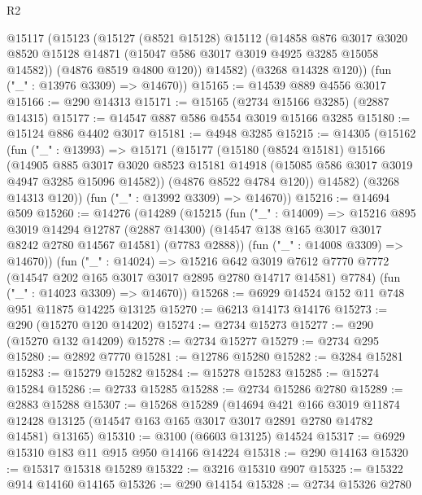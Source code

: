 \begin{lexlean}{R2}
\begin{coremodule}
      @15117
        (@15123
          (@15127
            (@8521 @15128)
            @15112
            (@14858
              @876
              @3017
              @3020
              @8520
              @15128
              @14871
              (@15047 @586 @3017 @3019 @4925 @3285 @15058 @14582))
            (@4876 @8519 @4800 @120))
          @14582)
        (@3268 @14328 @120))
      (fun ("_" : @13976 @3309) => @14670))
@15165 := @14539 @889 @4556 @3017
@15166 := @290 @14313
@15171 := @15165 (@2734 @15166 @3285) (@2887 @14315)
@15177 := @14547 @887 @586 @4554 @3019 @15166 @3285
@15180 := @15124 @886 @4402 @3017
@15181 := @4948 @3285
@15215 := @14305
    (@15162
      (fun ("_" : @13993) =>
      @15171
        (@15177
          (@15180
            (@8524 @15181)
            @15166
            (@14905
              @885
              @3017
              @3020
              @8523
              @15181
              @14918
              (@15085 @586 @3017 @3019 @4947 @3285 @15096 @14582))
            (@4876 @8522 @4784 @120))
          @14582)
        (@3268 @14313 @120))
      (fun ("_" : @13992 @3309) => @14670))
@15216 := @14694 @509
@15260 := @14276
    (@14289
      (@15215
        (fun ("_" : @14009) =>
        @15216
          @895
          @3019
          @14294
          @12787
          (@2887 @14300)
          (@14547 @138 @165 @3017 @3017 @8242 @2780 @14567 @14581)
          (@7783 @2888))
        (fun ("_" : @14008 @3309) => @14670))
      (fun ("_" : @14024) =>
      @15216
        @642
        @3019
        @7612
        @7770
        @7772
        (@14547 @202 @165 @3017 @3017 @2895 @2780 @14717 @14581)
        @7784)
      (fun ("_" : @14023 @3309) => @14670))
@15268 := @6929 @14524 @152 @11 @748 @951 @11875 @14225 @13125
@15270 := @6213 @14173 @14176
@15273 := @290 (@15270 @120 @14202)
@15274 := @2734 @15273
@15277 := @290 (@15270 @132 @14209)
@15278 := @2734 @15277
@15279 := @2734 @295
@15280 := @2892 @7770
@15281 := @12786 @15280
@15282 := @3284 @15281
@15283 := @15279 @15282
@15284 := @15278 @15283
@15285 := @15274 @15284
@15286 := @2733 @15285
@15288 := @2734 @15286 @2780
@15289 := @2883 @15288
@15307 := @15268
    @15289
    (@14694
      @421
      @166
      @3019
      @11874
      @12428
      @13125
      (@14547 @163 @165 @3017 @3017 @2891 @2780 @14782 @14581)
      @13165)
@15310 := @3100 (@6603 @13125) @14524
@15317 := @6929 @15310 @183 @11 @915 @950 @14166 @14224
@15318 := @290 @14163
@15320 := @15317 @15318 @15289
@15322 := @3216 @15310 @907
@15325 := @15322 @914 @14160 @14165
@15326 := @290 @14154
@15328 := @2734 @15326 @2780

\end{coremodule}
\end{lexlean}
